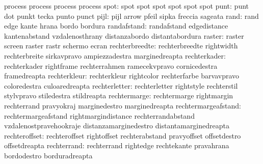         process  process
        process  process
  spot: spot spot
        spot spot
        spot spot
                     punt: punt                      dot
                           punkt                     tecka
                           punto                     punct
                     pijl: pijl                      arrow
                           pfeil                     sipka
                           freccia                   sageata
                     rand: rand                      edge
                           kante                     hrana
                           bordo                     bordura
              randafstand: randafstand               edgedistance
                           kantenabstand             vzdalenosthrany
                           distanzabordo             distantabordura
                   raster: raster                    screen
                           raster                    rastr
                           schermo                   ecran
           rechterbreedte: rechterbreedte            rightwidth
                           rechterbreite             sirkavpravo
                           ampiezzadestra            marginedreapta
             rechterkader: rechterkader              rightframe
                           rechterrahmen             ramecekvpravo
                           cornicedestra             framedreapta
             rechterkleur: rechterkleur              rightcolor
                           rechterfarbe              barvavpravo
                           coloredestra              culoaredreapta
            rechterletter: rechterletter             rightstyle
                           rechterstil               stylvpravo
                           stiledestra               stildreapta
             rechtermarge: rechtermarge              rightmargin
                           rechterrand               pravyokraj
                           marginedestro             marginedreapta
      rechtermargeafstand: rechtermargeafstand       rightmargindistance
                           rechterrandabstand        vzdalenostpravehookraje
                           distanzamarginedestro     distantamarginedreapta
            rechteroffset: rechteroffset             rightoffset
                           rechterabstand            pravyoffset
                           offsetdestro              offsetdreapta
              rechterrand: rechterrand               rightedge
                           rechtekante               pravahrana
                           bordodestro               borduradreapta
